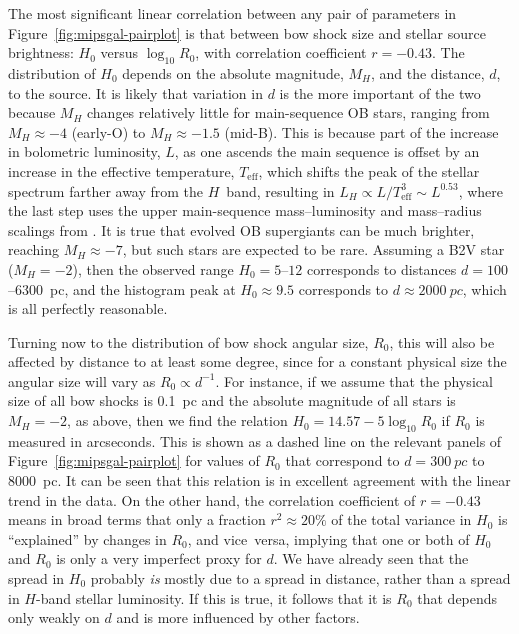 The most significant linear correlation between any pair of parameters
in Figure~\ref{fig:mipsgal-pairplot} is that between bow shock size
and stellar source brightness: \(H_0\) versus \(\log_{10} R_0\), with
correlation coefficient \(r = -0.43\).  The distribution of \(H_0\)
depends on the absolute magnitude, \(M_H\), and the distance, \(d\),
to the source.  It is likely that variation in \(d\) is the more
important of the two because \(M_H\) changes relatively little for
main-sequence OB stars, ranging from \(M_H \approx -4\) (early-O) to
\(M_H \approx -1.5\) (mid-B).  This is because part of the increase in
bolometric luminosity, \(L\), as one ascends the main sequence is
offset by an increase in the effective temperature,
\(T_{\text{eff}}\), which shifts the peak of the stellar spectrum
farther away from the \(H\)~band, resulting in
\(L_H \propto L / T_{\text{eff}}^3 \sim L^{0.53}\), where the last step uses
the upper main-sequence mass--luminosity and mass--radius scalings from
\citet{Eker:2015a}. It is true that evolved OB supergiants can be much
brighter, reaching \(M_H \approx -7\), but such stars are expected to be
rare.  Assuming a B2V star (\(M_H = -2\)), then the observed range
\(H_0 = 5\)--\(12\) corresponds to distances
\(d = 100\)--\SI{6300}{pc}, and the histogram peak at
\(H_0 \approx 9.5\) corresponds to \(d \approx \SI{2000}{pc}\), which is all
perfectly reasonable.

Turning now to the distribution of bow shock angular size, \(R_0\),
this will also be affected by distance to at least some degree, since
for a constant physical size the angular size will vary as
\(R_0 \propto d^{-1}\).  For instance, if we assume that the physical size
of all bow shocks is \SI{0.1}{pc} and the absolute magnitude of all
stars is \(M_H = -2\), as above, then we find the relation
\(H_0 = 14.57 - 5 \log_{10} R_0\) if \(R_0\) is measured in
arcseconds. This is shown as a dashed line on the relevant panels of
Figure~\ref{fig:mipsgal-pairplot} for values of \(R_0\) that
correspond to \(d = \SI{300}{pc}\) to \SI{8000}{pc}.  It can be seen
that this relation is in excellent agreement with the linear trend in
the data. On the other hand, the correlation coefficient of
\(r = -0.43\) means in broad terms that only a fraction
\(r^2 \approx 20\%\) of the total variance in \(H_0\) is ``explained'' by
changes in \(R_0\), and vice~versa, implying that one or both of
\(H_0\) and \(R_0\) is only a very imperfect proxy for \(d\).  We have
already seen that the spread in \(H_0\) probably \emph{is} mostly due
to a spread in distance, rather than a spread in \(H\)-band stellar
luminosity.  If this is true, it follows that it is \(R_0\) that
depends only weakly on \(d\) and is more influenced by other factors.

